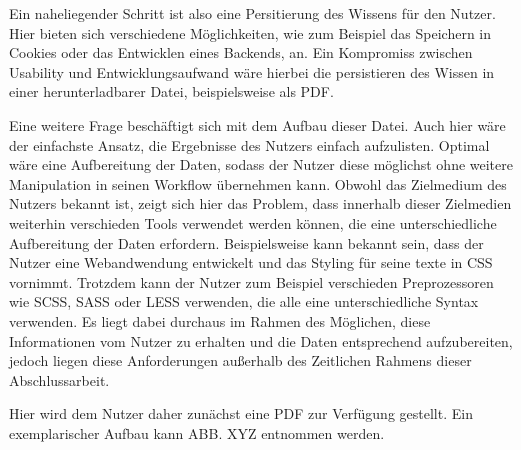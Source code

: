 Ein naheliegender Schritt ist also eine Persitierung des Wissens für den Nutzer. Hier bieten sich verschiedene Möglichkeiten, wie zum Beispiel das Speichern in Cookies oder das Entwicklen eines Backends, an. Ein Kompromiss zwischen Usability und Entwicklungsaufwand wäre hierbei die persistieren des Wissen in einer herunterladbarer Datei, beispielsweise als PDF.

Eine weitere Frage beschäftigt sich mit dem Aufbau dieser Datei. Auch hier wäre der einfachste Ansatz, die Ergebnisse des Nutzers einfach aufzulisten. Optimal wäre eine Aufbereitung der Daten, sodass der Nutzer diese möglichst ohne weitere Manipulation in seinen Workflow übernehmen kann. Obwohl das Zielmedium des Nutzers bekannt ist, zeigt sich hier das Problem, dass innerhalb dieser Zielmedien weiterhin verschieden Tools verwendet werden können, die eine unterschiedliche Aufbereitung der Daten erfordern.
Beispielsweise kann bekannt sein, dass der Nutzer eine Webandwendung entwickelt und das Styling für seine texte in CSS vornimmt. Trotzdem kann der Nutzer zum Beispiel verschieden Preprozessoren wie SCSS, SASS oder LESS verwenden, die alle eine unterschiedliche Syntax verwenden.
Es liegt dabei durchaus im Rahmen des Möglichen, diese Informationen vom Nutzer zu erhalten und die Daten entsprechend aufzubereiten, jedoch liegen diese Anforderungen außerhalb des Zeitlichen Rahmens dieser Abschlussarbeit.

Hier wird dem Nutzer daher zunächst eine PDF zur Verfügung gestellt. Ein exemplarischer Aufbau kann ABB. XYZ entnommen werden.
